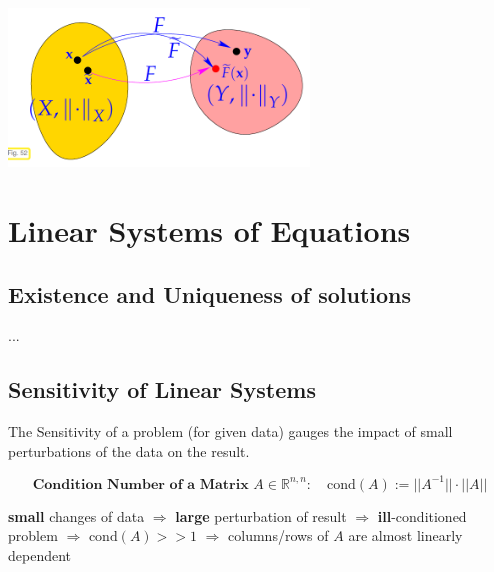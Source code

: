 \documentclass[12pt, a4paper]{article}
\newcommand{\R}{\mathbb{R}}
\begin{document}
\begin{center}
	 \includegraphics[width=0.6\textwidth]{stable_algorithm2.png}
\end{center}

\newpage
\section{Linear Systems of Equations}

\subsection{Existence and Uniqueness of solutions}
...

\subsection{Sensitivity of Linear Systems}

The Sensitivity of a problem (for given data) gauges the impact of small perturbations of the data on the result. \\

\begin{tcolorbox}
		\vspace{-5mm}
	\begin{equation*}
	\textbf{Condition Number of a Matrix } A \in \R^{n,n}:\quad \text{cond}(A) := ||A^{-1}||\cdot||A||
	\end{equation*}
\end{tcolorbox}

\begin{center}
		\textbf{small} changes of data $\Rightarrow$ \textbf{large} perturbation of result $\Rightarrow$ \textbf{ill}-conditioned problem $\Rightarrow$ $\text{cond}(A) >> 1$ $\Rightarrow$ columns/rows of $A$ are almost linearly dependent \\
\end{center}
\end{document}

